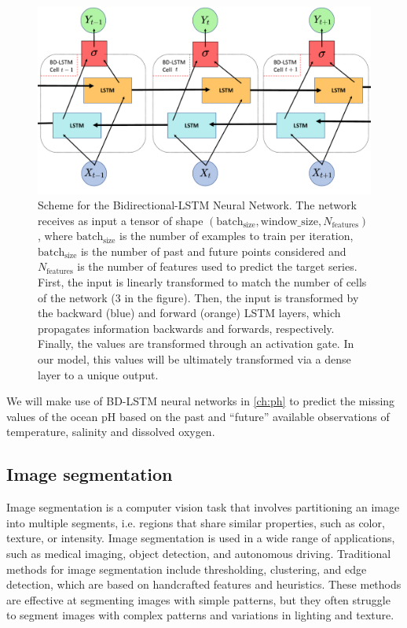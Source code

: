 \begin{figure}[H]
  \centering
  \includegraphics[width=\textwidth]{Figures/BD_LSTM_scheme.pdf}
  \caption{Scheme for the Bidirectional-LSTM Neural Network. The network
    receives as input a tensor of shape $(\textrm{batch}_\textrm{size},
      \textrm{window}\_\textrm{size}, N_{\textrm{features}})$, where
    $\textrm{batch}_\textrm{size}$ is the number of examples to train per
    iteration, $\textrm{batch}_\textrm{size}$ is the number of past and
    future
    points considered and $N_{\textrm{features}}$ is the number of features
    used to
    predict the target series. First, the input is linearly transformed to
    match
    the number of cells of the network (3 in the figure). Then, the input
    is
    transformed by the backward (blue) and forward (orange) LSTM layers,
    which
    propagates information backwards and forwards, respectively. Finally,
    the
    values are transformed through an activation gate. In our model, this
    values
    will be ultimately transformed via a dense layer to a unique output.}
  \label{fig:BD_LSTM_scheme}
\end{figure}

We will make use of BD-LSTM neural networks in \cref{ch:ph} to predict the
missing values of the ocean pH based on the past and ``future'' available
observations of temperature, salinity and dissolved oxygen.

\subsection{\label{sec: Image segmentation} Image segmentation}

Image segmentation is a computer vision task that involves partitioning an
image into multiple segments, i.e. regions that share similar properties, such
as color, texture, or intensity. Image segmentation is used in a wide range of
applications, such as medical imaging, object detection, and autonomous
driving. Traditional methods for image segmentation include thresholding,
clustering, and edge detection, which are based on handcrafted features and
heuristics. These methods are effective at segmenting images with simple
patterns, but they often struggle to segment images with complex patterns and
variations in lighting and texture.

